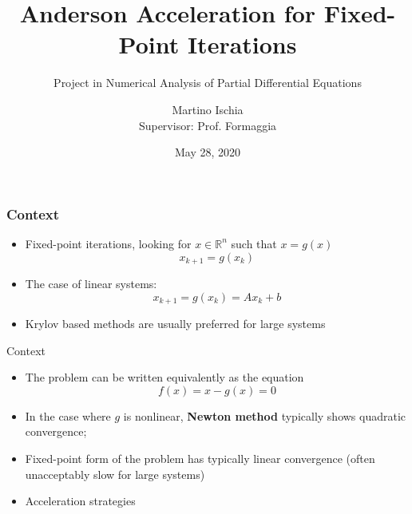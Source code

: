 \documentclass{beamer}
\title[Anderson Acceleration]{Anderson Acceleration for Fixed-Point Iterations}
\subtitle {Project in Numerical Analysis of Partial Differential Equations}
\author[Martino Ischia]{Martino Ischia\\ \footnotesize{Supervisor: Prof. Formaggia}}
\institute[]
		{
		Politecnico di Milano
		}
\date{May 28, 2020}
\begin{document}
			
			\begin{frame}
				\titlepage 
			\end{frame}
			
			
			
				
				\begin{frame}
					\frametitle{Context}
					\begin{itemize}
						\item Fixed-point iterations, looking for $x\in\mathbb{R}^n$ such that $x=g(x)$
						$$x_{k+1} = g(x_k)$$
						\item The case of linear systems:
						$$x_{k+1} = g(x_k) = A x_k + b$$
						\item Krylov based methods are usually preferred for large   systems
					\end{itemize}
				\end{frame}
				
				
				\begin{frame}{Context}
					
					\begin{itemize}
						\item The problem can be written equivalently as the equation
						$$ f(x) = x - g(x) = 0 $$
						\item In the case where $g$ is nonlinear, \textbf{Newton method} typically shows quadratic convergence;
						\item Fixed-point form of the problem has typically linear convergence (often unacceptably slow for large systems)
						\item  Acceleration strategies
					\end{itemize}    
				\end{frame}
				
\end{document}
